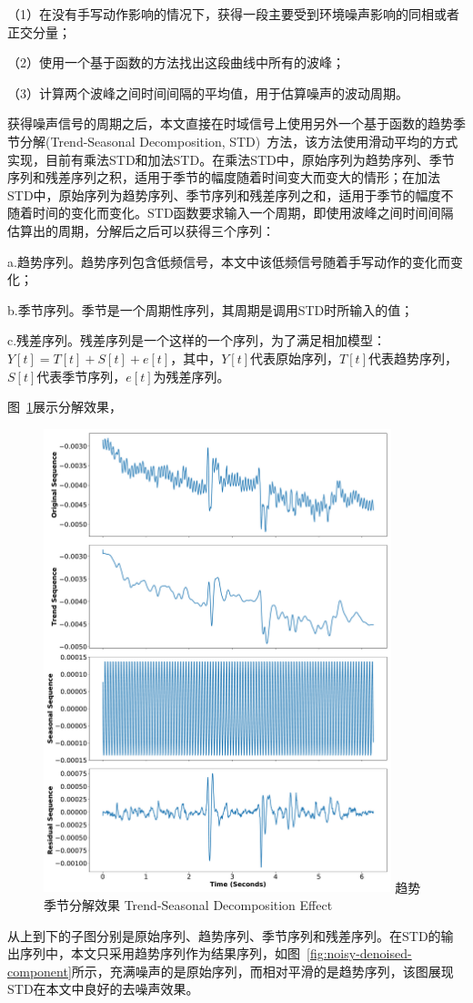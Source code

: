 （1）在没有手写动作影响的情况下，获得一段主要受到环境噪声影响的同相或者正交分量；

（2）使用一个基于函数的方法找出这段曲线中所有的波峰；

（3）计算两个波峰之间时间间隔的平均值，用于估算噪声的波动周期。

获得噪声信号的周期之后，本文直接在时域信号上使用另外一个基于函数的趋势季节分解(Trend-Seasonal Decomposition, STD)~\cite{cleveland1990stl}方法，该方法使用滑动平均的方式实现，目前有乘法STD和加法STD。在乘法STD中，原始序列为趋势序列、季节序列和残差序列之积，适用于季节的幅度随着时间变大而变大的情形；在加法STD中，原始序列为趋势序列、季节序列和残差序列之和，适用于季节的幅度不随着时间的变化而变化。STD函数要求输入一个周期，即使用波峰之间时间间隔估算出的周期，分解后之后可以获得三个序列：

a.趋势序列。趋势序列包含低频信号，本文中该低频信号随着手写动作的变化而变化；

b.季节序列。季节是一个周期性序列，其周期是调用STD时所输入的值；

c.残差序列。残差序列是一个这样的一个序列，为了满足相加模型：$Y[t] = T[t] + S[t] + e[t]$，其中，$Y[t]$代表原始序列，$T[t]$代表趋势序列，$S[t]$代表季节序列，$e[t]$为残差序列。

图~\ref{fig:trend-seasonal-decomposition-effect}展示分解效果，
\begin{figure}[!htp]
  \centering
  \includegraphics[width=0.9\textwidth]{figure/std-effect.pdf}
  \bicaption
    {趋势季节分解效果}
    {Trend-Seasonal Decomposition Effect}
  \label{fig:trend-seasonal-decomposition-effect}
\end{figure}
从上到下的子图分别是原始序列、趋势序列、季节序列和残差序列。在STD的输出序列中，本文只采用趋势序列作为结果序列，如图~\ref{fig:noisy-denoised-component}所示，充满噪声的是原始序列，而相对平滑的是趋势序列，该图展现STD在本文中良好的去噪声效果。

